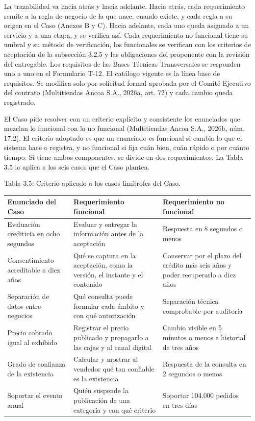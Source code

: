 \documentclass[11pt]{article}
\begin{document}
La trazabilidad va hacia atrás y hacia adelante. Hacia atrás, cada requerimiento remite a la regla de negocio de la que nace, cuando existe, y cada regla a su origen en el Caso (Anexos B y C). Hacia adelante, cada uno queda asignado a un servicio y a una etapa, y se verifica así. Cada requerimiento no funcional tiene su umbral y su método de verificación, los funcionales se verifican con los criterios de aceptación de la subsección 3.2.5 y las obligaciones del proponente con la revisión del entregable. Los requisitos de las Bases Técnicas Transversales se responden uno a uno en el Formulario T-12. El catálogo vigente es la línea base de requisitos. Se modifica solo por solicitud formal aprobada por el Comité Ejecutivo del contrato (Multitiendas Ancoa S.A., 2026a, art. 72) y cada cambio queda registrado.

El Caso pide resolver con un criterio explícito y consistente los enunciados que mezclan lo funcional con lo no funcional (Multitiendas Ancoa S.A., 2026b, núm. 17.2). El criterio adoptado es que un enunciado es funcional si cambia lo que el sistema hace o registra, y no funcional si fija cuán bien, cuán rápido o por cuánto tiempo. Si tiene ambos componentes, se divide en dos requerimientos. La Tabla 3.5 lo aplica a los seis casos que el Caso plantea.

Tabla 3.5: Criterio aplicado a los casos limítrofes del Caso.

\begin{longtable}[]{@{}
  >{\raggedright\arraybackslash}p{}
  >{\raggedright\arraybackslash}p{}
  >{\raggedright\arraybackslash}p{}@{}}
\toprule\noalign{}
Enunciado del Caso & Requerimiento funcional & Requerimiento no funcional \\
\midrule\noalign{}
\endhead
\bottomrule\noalign{}
\endlastfoot
Evaluación crediticia en ocho segundos & Evaluar y entregar la información antes de la aceptación & Respuesta en 8 segundos o menos \\
Consentimiento acreditable a diez años & Qué se captura en la aceptación, como la versión, el instante y el contenido & Conservar por el plazo del crédito más seis años y poder recuperarlo a diez años \\
Separación de datos entre negocios & Qué consulta puede formular cada ámbito y con qué autorización & Separación técnica comprobable por auditoría \\
Precio cobrado igual al exhibido & Registrar el precio publicado y propagarlo a las cajas y al canal digital & Cambio visible en 5 minutos o menos e historial de tres años \\
Grado de confianza de la existencia & Calcular y mostrar al vendedor qué tan confiable es la existencia & Respuesta de la consulta en 2 segundos o menos \\
Soportar el evento anual & Quién suspende la publicación de una categoría y con qué criterio & Soportar 104.000 pedidos en tres días \\
\end{longtable}
\end{document}
